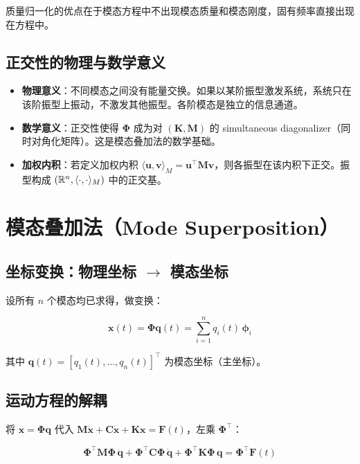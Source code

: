 质量归一化的优点在于模态方程中不出现模态质量和模态刚度，固有频率直接出现在方程中。

\subsection{正交性的物理与数学意义}

\begin{itemize}
\item \textbf{物理意义}：不同模态之间没有能量交换。如果以某阶振型激发系统，系统只在该阶振型上振动，不激发其他振型。各阶模态是独立的信息通道。
\item \textbf{数学意义}：正交性使得 $\mathbf{\Phi}$ 成为对 $(\mathbf{K}, \mathbf{M})$ 的 simultaneous diagonalizer（同时对角化矩阵）。这是模态叠加法的数学基础。
\item \textbf{加权内积}：若定义加权内积 $\langle\mathbf{u},\mathbf{v}\rangle_M = \mathbf{u}^{\top}\mathbf{M}\mathbf{v}$，则各振型在该内积下正交。振型构成 $(\mathbb{R}^n, \langle\cdot,\cdot\rangle_M)$ 中的正交基。
\end{itemize}

\section{模态叠加法（Mode Superposition）}

\subsection{坐标变换：物理坐标 $\to$ 模态坐标}

设所有 $n$ 个模态均已求得，做变换：

\begin{myformula}
\[
\mathbf{x}(t) = \mathbf{\Phi} \mathbf{q}(t) = \sum_{i=1}^{n} q_i(t)\,\bm{\phi}_i
\]
\end{myformula}

其中 $\mathbf{q}(t) = [q_1(t), \ldots, q_n(t)]^{\top}$ 为模态坐标（主坐标）。

\subsection{运动方程的解耦}

将 $\mathbf{x} = \mathbf{\Phi}\mathbf{q}$ 代入 $\mathbf{M}\ddot{\mathbf{x}} + \mathbf{C}\dot{\mathbf{x}} + \mathbf{K}\mathbf{x} = \mathbf{F}(t)$，左乘 $\mathbf{\Phi}^{\top}$：

\begin{myformula}
\[
\mathbf{\Phi}^{\top}\mathbf{M}\mathbf{\Phi}\,\ddot{\mathbf{q}} + \mathbf{\Phi}^{\top}\mathbf{C}\mathbf{\Phi}\,\dot{\mathbf{q}} + \mathbf{\Phi}^{\top}\mathbf{K}\mathbf{\Phi}\,\mathbf{q} = \mathbf{\Phi}^{\top}\mathbf{F}(t)
\]
\end{myformula}

